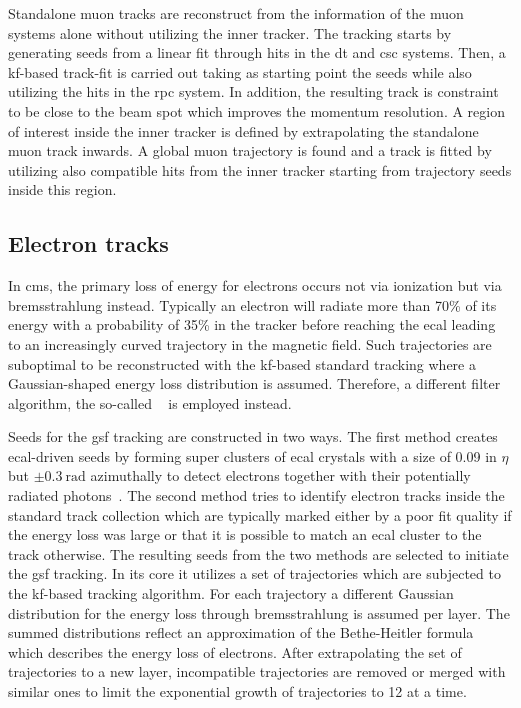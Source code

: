 Standalone muon tracks are reconstruct from the information of the muon systems alone without utilizing the inner tracker. The tracking starts by generating seeds from a linear fit through hits in the \gls{dt} and \gls{csc} systems. Then, a \gls{kf}-based track-fit is carried out taking as starting point the seeds while also utilizing the hits in the \gls{rpc} system. In addition, the resulting track is constraint to be close to the beam spot which improves the momentum resolution. A region of interest inside the inner tracker is defined by extrapolating the standalone muon track inwards. A global muon trajectory is found and a track is fitted by utilizing also compatible hits from the inner tracker starting from trajectory seeds inside this region.


\subsection{Electron tracks}
\label{sec:reconstruction-electrontracks}

In \gls{cms}, the primary loss of energy for electrons occurs not via ionization but via bremsstrahlung instead. Typically an electron will radiate more than 70\% of its energy with a probability of 35\% in the tracker before reaching the \gls{ecal} leading to an increasingly curved trajectory in the magnetic field. Such trajectories are suboptimal to be reconstructed with the \gls{kf}-based standard tracking where a Gaussian-shaped energy loss distribution is assumed. Therefore, a different filter algorithm, the so-called ~\cite{0954-3899-31-9-N01} is employed instead.

Seeds for the \gls{gsf} tracking are constructed in two ways. The first method creates \gls{ecal}-driven seeds by forming super clusters of \gls{ecal} crystals with a size of 0.09 in $\eta$ but $\pm0.3~\mathrm{rad}$ azimuthally to detect electrons together with their potentially radiated photons~\cite{CMS:2010aua}. The second method tries to identify electron tracks inside the standard track collection which are typically marked either by a poor fit quality if the energy loss was large or that it is possible to match an \gls{ecal} cluster to the track otherwise. The resulting seeds from the two methods are selected to initiate the \gls{gsf} tracking. In its core it utilizes a set of trajectories which are subjected to the \gls{kf}-based tracking algorithm. For each trajectory a different Gaussian distribution for the energy loss through bremsstrahlung is assumed per layer. The summed distributions reflect an approximation of the Bethe-Heitler formula which describes the energy loss of electrons. After extrapolating the set of trajectories to a new layer, incompatible trajectories are removed or merged with similar ones to limit the exponential growth of trajectories to 12 at a time.

